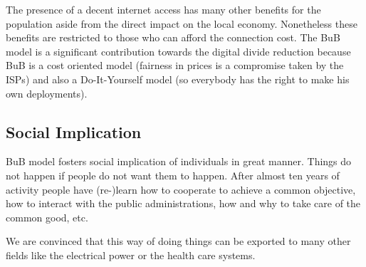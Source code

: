 The presence of a decent internet access has many other benefits for the population aside from the direct impact on the local economy. Nonetheless these benefits are restricted to those who can afford the connection cost. The BuB model is a significant contribution towards the digital divide reduction because BuB is a cost oriented model (fairness in prices is a compromise taken by the ISPs) and also a Do-It-Yourself model (so everybody has the right to make his own deployments).


\FloatBarrier
\subsection{Social Implication}
\label{res_social}

BuB model fosters social implication of individuals in great manner. Things do not happen if people do not want them to happen. After almost ten years of activity people have (re-)learn how to cooperate to achieve a common objective, how to interact with the public administrations, how and why to take care of the common good, etc.

We are convinced that this way of doing things can be exported to many other fields like the electrical power or the health care systems.

